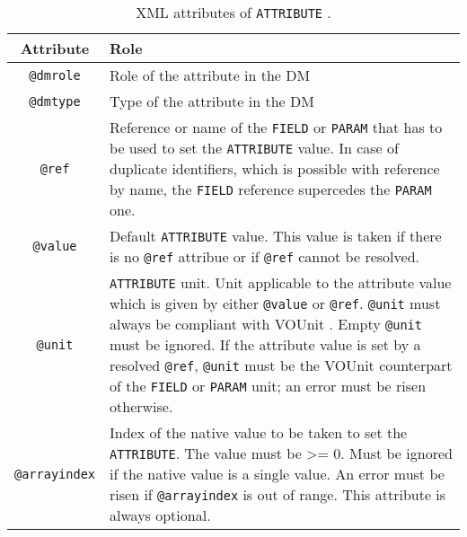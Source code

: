 \begin{table}[!htbp]
\small
\centering
\begin{tabulary}{\linewidth}{|c|J|}       
       \hline 
            \textbf{Attribute} & 
            \textbf {Role}\\
       \hline         \hline  
            \texttt{@dmrole} & 
            Role of the attribute in the DM\\
        \hline 
            \texttt{@dmtype} & 
            Type of the attribute in the DM\\
        \hline 
            \texttt{@ref} & 
            Reference or name of the \texttt{FIELD} or \texttt{PARAM} that has to be used to set the 
            \texttt{ATTRIBUTE} value. In case of duplicate identifiers, which is possible with reference by name, 
            the \texttt{FIELD} reference supercedes the \texttt{PARAM} one. \\
        \hline 
            \texttt{@value}  &
            Default \texttt{ATTRIBUTE} value. This value is taken if there is no 
            \texttt{@ref} attribue or if \texttt{@ref} cannot be resolved.\\
        \hline 
            \texttt{@unit} & 
            \texttt{ATTRIBUTE} unit. Unit applicable to the attribute value which is given 
            by either \texttt{@value} or \texttt{@ref}. \texttt{@unit} must always 
            be compliant with VOUnit \citep{2014ivoa.spec.0523D}. 
            Empty \texttt{@unit} must be ignored.
            If the attribute value is set by a resolved \texttt{@ref}, 
            \texttt{@unit} must be the VOUnit counterpart of the \texttt{FIELD} or \texttt{PARAM} unit;
            an error must be risen otherwise.\\
        \hline 
            \texttt{@arrayindex} & 
            Index of the native value to be taken to set the \texttt{ATTRIBUTE}. 
            The value must be >= 0.
            Must be ignored if the native value is a single value. 
            An error must be risen if \texttt{@arrayindex} is out of range.
            This attribute is always optional.\\
        \hline 
     \end{tabulary}
     \caption{XML attributes of  \texttt{ATTRIBUTE} .} 
     \label{tbl:attribute-att}
 \end{table}


